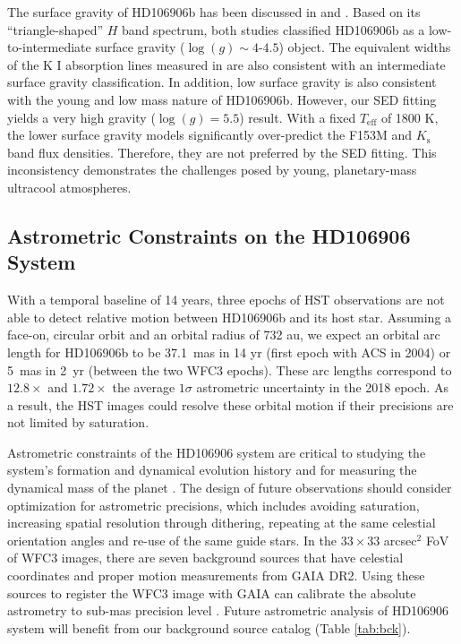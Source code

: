 \documentclass[twocolumn, trackchanges]{aastex62}
\newcommand{\logg}{\ensuremath{\log(g)}\xspace}
\begin{document}
The surface gravity of HD106906b has been discussed in \citet{Bailey2013} and \citet{Daemgen2017}.  Based on its ``triangle-shaped'' $H$ band spectrum, both studies classified HD106906b as a low-to-intermediate surface gravity ($\logg\sim4\mbox{-}4.5$) object. The equivalent widths of the K I absorption lines measured in \citet{Daemgen2017} are also consistent with an intermediate surface gravity classification. In addition, low surface gravity is also consistent with the young and low mass nature of HD106906b. However, our SED fitting yields a very high gravity ($\logg=5.5$) result. With a fixed $T_{\mathrm{eff}}$ of 1800 K, the lower surface gravity models significantly over-predict the F153M and $K_{\mathrm{s}}$ band flux {densities}. Therefore, they are not preferred by the SED fitting. This inconsistency demonstrates the challenges posed by young, planetary-mass ultracool atmospheres.



\subsection{Astrometric Constraints on the  HD106906 System}
\label{sec:HD106906:astrometry-discussion}
With a temporal baseline of 14 years, three epochs of HST observations are not able to detect relative motion between HD106906b and its host star. Assuming a face-on, circular orbit and an orbital radius of 732 au, we expect an orbital arc length for HD106906b to be 37.1~mas in 14 yr (first epoch with ACS in 2004) or 5~mas in 2~yr (between the two WFC3 epochs). These arc lengths correspond to $12.8\times$ and $1.72\times$ the average $1\sigma$ astrometric uncertainty in the 2018 epoch. As a result, the HST images could resolve these orbital motion if their precisions are not limited by saturation.

Astrometric constraints of the HD106906 system are critical to studying the system's formation and dynamical evolution history \citep[e.g., ][]{DeRosa2019} and for measuring the dynamical mass of the planet \citep[e.g.,][]{Snellen2018,Dupuy2019}. The design of future observations should consider optimization for astrometric precisions, which includes avoiding saturation, increasing spatial resolution through dithering, repeating at the same celestial orientation angles and re-use of the same guide stars. In the $33\times33$ arcsec$^{2}$ FoV of WFC3 images, there are seven background sources that have {celestial} coordinates and proper motion measurements from GAIA DR2. Using these sources to register the WFC3 image with GAIA can calibrate the absolute astrometry to sub-mas precision level \citep{Bedin2018}. Future astrometric analysis of HD106906 system will  benefit from our background source catalog (Table \ref{tab:bck}).
\end{document}
